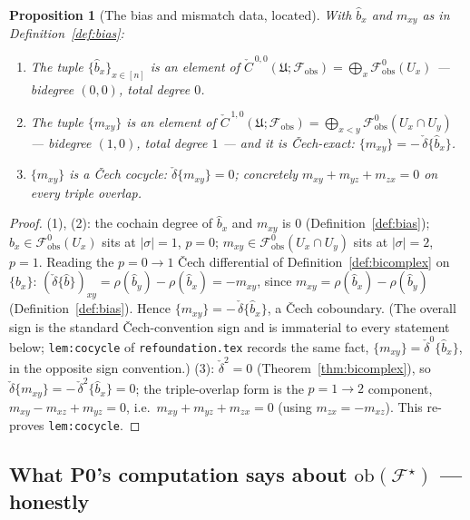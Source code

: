 \documentclass[11pt,oneside]{amsart}
\theoremstyle{plain}
\newtheorem{proposition}[theorem]{Proposition}
\theoremstyle{definition}
\theoremstyle{remark}
\theoremstyle{honeststyle}
\newcommand{\F}{\mathcal{F}}
\newcommand{\Fstar}{\F^{\star}}
\newcommand{\ob}{\mathrm{ob}}
\newcommand{\fobs}{\mathcal{F}_{\mathrm{obs}}}
\newcommand{\Uf}{\mathfrak{U}}
\newcommand{\Ccheck}{\check{C}}
\begin{document}
\begin{proposition}[The bias and mismatch data, located]
\label{prop:located}
With $\widehat b_{x}$ and $m_{xy}$ as in Definition~\ref{def:bias}:
\begin{enumerate}[label=\textup{(\arabic*)},leftmargin=2.4em]
\item The tuple $\{\widehat b_{x}\}_{x\in[n]}$ is an element of
  $\Ccheck^{\,0,0}(\Uf;\fobs)=\bigoplus_{x}\fobs^{0}(U_{x})$ ---
  bidegree $(0,0)$, total degree $0$.
\item The tuple $\{m_{xy}\}$ is an element of $\Ccheck^{\,1,0}(\Uf;
  \fobs)=\bigoplus_{x<y}\fobs^{0}(U_{x}\cap U_{y})$ --- bidegree
  $(1,0)$, total degree $1$ --- and it is \v{C}ech-exact:
  $\{m_{xy}\}=-\,\check\delta\{\widehat b_{x}\}$.
\item $\{m_{xy}\}$ is a \v{C}ech cocycle: $\check\delta\{m_{xy}\}=0$;
  concretely $m_{xy}+m_{yz}+m_{zx}=0$ on every triple overlap.
\end{enumerate}
\end{proposition}

\begin{proof}
(1), (2): the cochain degree of $\widehat b_{x}$ and $m_{xy}$ is $0$
(Definition~\ref{def:bias}); $\widehat b_{x}\in\fobs^{0}(U_{x})$ sits
at $|\sigma|=1$, $p=0$; $m_{xy}\in\fobs^{0}(U_{x}\cap U_{y})$ sits at
$|\sigma|=2$, $p=1$. Reading the $p=0\to1$ \v{C}ech differential of
Definition~\ref{def:bicomplex} on $\{\widehat b_{x}\}$:
$(\check\delta\{\widehat b\})_{xy}=\rho(\widehat b_{y})-\rho(\widehat
b_{x})=-m_{xy}$, since $m_{xy}=\rho(\widehat b_{x})-\rho(\widehat
b_{y})$ (Definition~\ref{def:bias}). Hence $\{m_{xy}\}=
-\,\check\delta\{\widehat b_{x}\}$, a \v{C}ech coboundary. (The
overall sign is the standard \v{C}ech-convention sign and is
immaterial to every statement below; \texttt{lem:cocycle} of
\texttt{refoundation.tex} records the same fact, $\{m_{xy}\}=
\check\delta^{0}\{\widehat b_{x}\}$, in the opposite sign convention.)
(3): $\check\delta^{2}=0$ (Theorem~\ref{thm:bicomplex}), so
$\check\delta\{m_{xy}\}=-\,\check\delta^{2}\{\widehat b_{x}\}=0$;
the triple-overlap form is the $p=1\to2$ component, $m_{xy}-m_{xz}
+m_{yz}=0$, i.e.\ $m_{xy}+m_{yz}+m_{zx}=0$ (using $m_{zx}=-m_{xz}$).
This re-proves \texttt{lem:cocycle}.
\end{proof}

\subsection{What P0's computation says about $\ob(\Fstar)$ --- honestly}
\label{ssec:honest-ob}
\end{document}

